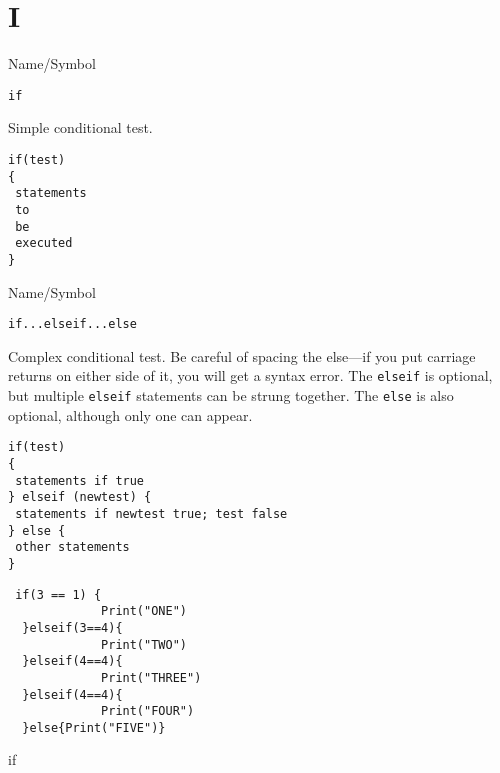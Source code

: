 \rl


\section{I}
\rl


\begin{desc}{Name/Symbol}
\item[Name/Symbol]	\verb+if+ 

\item[Description]	Simple conditional test.

\item[Usage]
\begin{verbatim}
if(test)
{
 statements
 to
 be 
 executed
}
\end{verbatim}

\item[Example]	

\item[See Also]	
\end{desc}

\rl




\begin{desc}{Name/Symbol}
\item[Name/Symbol]	\verb+if...elseif...else+            

\item[Description] Complex conditional test.  Be careful of spacing
  the else---if you put carriage returns on either side of it, you
  will get a syntax error. The \verb+elseif+ is optional, but
  multiple \verb+elseif+ statements can be strung together.  The
  \verb+else+ is also optional, although only one can appear.

\item[Usage]
\begin{verbatim}
if(test)
{
 statements if true
} elseif (newtest) {
 statements if newtest true; test false
} else {
 other statements
} 
\end{verbatim}

\item[Example]	
\begin{verbatim}
 if(3 == 1) {
             Print("ONE")
  }elseif(3==4){
             Print("TWO")
  }elseif(4==4){
             Print("THREE")
  }elseif(4==4){
             Print("FOUR")
  }else{Print("FIVE")}
\end{verbatim}
\item[See Also]	
if
\end{desc}
\rl



